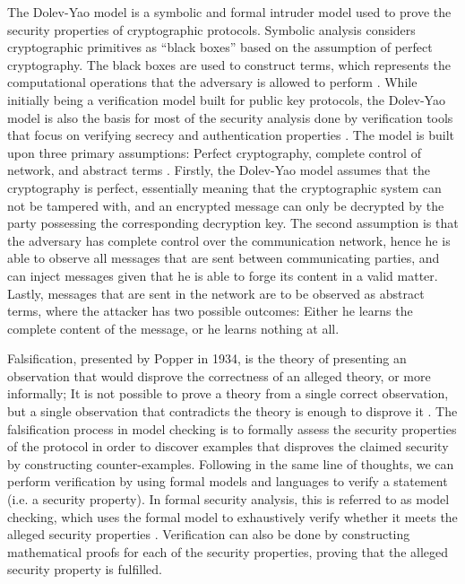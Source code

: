 The Dolev-Yao model is a symbolic and formal intruder model used to prove the security properties of cryptographic protocols. Symbolic analysis considers cryptographic primitives as ``black boxes'' based on the assumption of perfect cryptography. The black boxes are used to construct terms, which represents the computational operations that the adversary is allowed to perform \cite{blanchet2012security}. While initially being a verification model built for public key protocols, the Dolev-Yao model is also the basis for most of the security analysis done by verification tools that focus on verifying secrecy and authentication properties \cite{cremers2005operational}. The model is built upon three primary assumptions: Perfect cryptography, complete control of network, and abstract terms \cite{dolev1983security}. Firstly, the Dolev-Yao model assumes that the cryptography is perfect, essentially meaning that the cryptographic system can not be tampered with, and an encrypted message can only be decrypted by the party possessing the corresponding decryption key. The second assumption is that the adversary has complete control over the communication network, hence he is able to observe all messages that are sent between communicating parties, and can inject messages given that he is able to forge its content in a valid matter. Lastly, messages that are sent in the network are to be observed as abstract terms, where the attacker has two possible outcomes: Either he learns the complete content of the message, or he learns nothing at all. 


Falsification, presented by Popper in 1934, is the theory of presenting an observation that would disprove the correctness of an alleged theory, or more informally; It is not possible to prove a theory from a single correct observation, but a single observation that contradicts the theory is enough to disprove it \cite{popper2005logic}. The falsification process in model checking is to formally assess the security properties of the protocol in order to discover examples that disproves the claimed security by constructing counter-examples. Following in the same line of thoughts, we can perform verification by using formal models and languages to verify a statement (i.e. a security property). In formal security analysis, this is referred to as model checking, which uses the formal model to exhaustively verify whether it meets the alleged security properties \cite{basin2011model}. Verification can also be done by constructing mathematical proofs for each of the security properties, proving that the alleged security property is fulfilled. 



